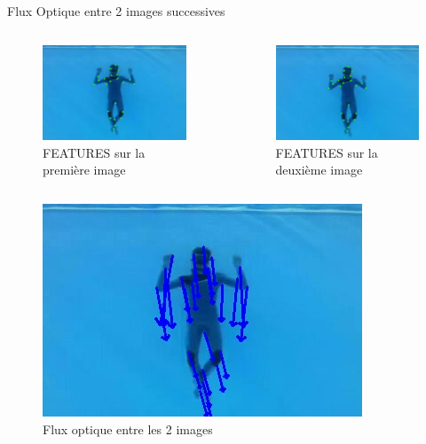 \documentclass{bredelebeamer}
\begin{document}
\begin{frame}{Flux Optique entre 2 images successives}

\begin{columns}

\begin{column}{0.3\textwidth}
\begin{figure}
\centering
\includegraphics[scale=0.3]{images/plongeurInitFeatures.jpeg}
\caption{FEATURES sur la première image}
\end{figure}
\end{column}


\begin{column}{0.3\textwidth}
\begin{figure}
\centering
\includegraphics[scale=0.3]{images/plongeurNextFeatures.jpeg}
\caption{FEATURES sur la deuxième image}
\end{figure}
\end{column}

\end{columns}

\begin{figure}
\centering
\includegraphics[scale=0.3]{images/plongeurOpticalFlow.jpeg}
\caption{Flux optique entre les 2 images}
\end{figure}


\end{frame}
\end{document}

